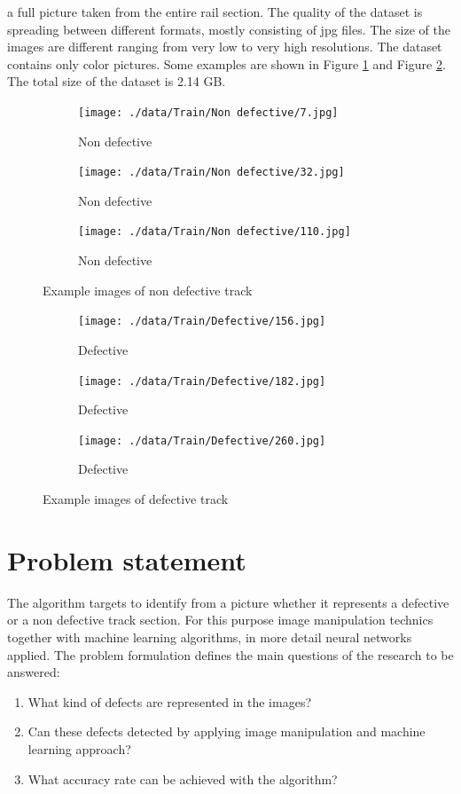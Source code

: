 \documentclass[10pt, final]{article}
\begin{document}
a full picture taken from the entire rail section.
The quality of the dataset is spreading between different formats, mostly consisting of jpg files.
The size of the images are different ranging from very low to very high resolutions.
The dataset contains only color pictures.
Some examples are shown in Figure \ref{fig:track_non_def} and Figure \ref{fig:track_def}.
The total size of the dataset is 2.14 GB.
\begin{figure}[!ht]
	\centering
	\begin{subfigure}{0.3\textwidth}
		\centering
		\texttt{[image: ./data/Train/Non defective/7.jpg]}
		\caption{Non defective}
	\end{subfigure}
	\begin{subfigure}{0.3\textwidth}
		\centering
		\texttt{[image: ./data/Train/Non defective/32.jpg]}
		\caption{Non defective}
	\end{subfigure}
	\begin{subfigure}{0.3\textwidth}
		\centering
		\texttt{[image: ./data/Train/Non defective/110.jpg]}
		\caption{Non defective}
	\end{subfigure}
	\caption{Example images of non defective track}
	\label{fig:track_non_def}
\end{figure}
\begin{figure}[!ht]
	\centering
	\begin{subfigure}{0.3\textwidth}
		\centering
		\texttt{[image: ./data/Train/Defective/156.jpg]}
		\caption{Defective}
	\end{subfigure}
	\begin{subfigure}{0.3\textwidth}
		\centering
		\texttt{[image: ./data/Train/Defective/182.jpg]}
		\caption{Defective}
	\end{subfigure}
	\begin{subfigure}{0.3\textwidth}
		\centering
		\texttt{[image: ./data/Train/Defective/260.jpg]}
		\caption{Defective}
	\end{subfigure}
	\caption{Example images of defective track}
	\label{fig:track_def}
\end{figure}

\section{Problem statement} \label{sec:prob_stat}
The algorithm targets to identify from a picture whether it represents a defective or a non defective
track section.
For this purpose image manipulation technics together with machine learning algorithms, in more detail
neural networks applied.
The problem formulation defines the main questions of the research to be answered:
\begin{enumerate}[label=Q\arabic*]
	\item \label{itm:Q1} What kind of defects are represented in the images?
	\item \label{itm:Q2} Can these defects detected by applying image manipulation
	      and machine learning approach?
	\item \label{itm:Q3} What accuracy rate can be achieved with the algorithm?
\end{enumerate}
\end{document}
